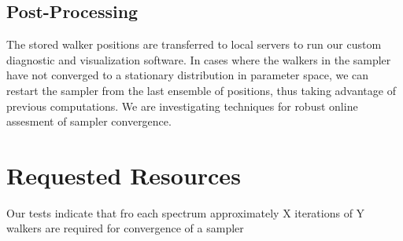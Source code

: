 \subsection{Post-Processing}
The stored walker positions are transferred to local servers to run
our custom diagnostic and visualization software.  In cases where the
walkers in the sampler have not converged to a stationary distribution
in parameter space, we can restart the sampler from the last ensemble
of positions, thus taking advantage of previous computations.  We are
investigating techniques for robust online assesment of sampler
convergence.


\section{Requested Resources}
Our tests indicate that fro each spectrum approximately X iterations
of Y walkers are required for convergence of a sampler